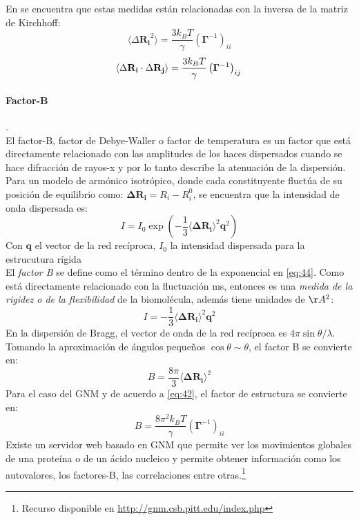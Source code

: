 En \cite{Rader2006} se encuentra que estas medidas est\'{a}n relacionadas con la inversa de la matriz de Kirchhoff:\\
\begin{equation}\label{eq:42}
\langle \Delta \mathbf{R_i}^2 \rangle=\frac{3 k_BT}{\gamma}\left(\mathbf{\Gamma}^{-1}\right)_{ii}
\end{equation}
\begin{equation}\label{eq:43}
\langle \Delta \mathbf{R_i}\cdot\Delta \mathbf{R_j} \rangle=\frac{3 k_BT}{\gamma}\left(\mathbf{\Gamma}^{-1}\right)_{ij}\\
\end{equation}
\paragraph{Factor-B}.\\
El factor-B, factor de Debye-Waller o factor de temperatura es un factor que est\'{a} directamente relacionado con las amplitudes de los haces dispersados cuando se hace difracci\'{o}n de rayos-x y por lo tanto describe la atenuaci\'{o}n de la dispersi\'{o}n.\\

Para un modelo de arm\'{o}nico isotr\'{o}pico, donde cada constituyente fluct\'{u}a de su posici\'{o}n de equilibrio como: $\mathbf{\Delta R_{i}}=R_i-R_i^0$, se encuentra que la intensidad de onda dispersada es:
\begin{equation}\label{eq:44}
I=I_0\exp\left(-\frac{1}{3}\langle\mathbf{\Delta R_{i}}\rangle^2 \mathbf{q}^2\right)
\end{equation}
Con $\mathbf{q}$ el vector de la red rec\'{i}proca, $I_0$ la intensidad dispersada para la estrucutura r\'{i}gida\\

El \textit{factor B} se define como el t\'{e}rmino dentro de la exponencial en \eqref{eq:44}. Como est\'{a} directamente relacionado con la fluctuaci\'{o}n ms, entonces es una \textit{medida de la rigidez o de la flexibilidad} de la biomol\'{e}cula, adem\'{a}s tiene unidades de $\AA^2$:
\begin{equation}\label{eq:45}
I=-\frac{1}{3}\langle\mathbf{\Delta R_{i}}\rangle^2 \mathbf{q}^2
\end{equation}
En la dispersi\'{o}n de Bragg, el vector de onda de la red rec\'{i}proca es $4\pi\sin\theta/\lambda$. Tomando la aproximaci\'{o}n de \'{a}ngulos peque\~{n}os $\cos \theta\sim \theta$, el factor B se convierte en:
\begin{equation}\label{eq:46}
B=\frac{8\pi}{3}\langle\mathbf{\Delta R_{i}}\rangle^2
\end{equation}
Para el caso del GNM y de acuerdo a \eqref{eq:42}, el factor de estructura se convierte en:
\begin{equation}\label{eq:47}
B=\frac{8\pi^2 k_BT}{\gamma}\left(\mathbf{\Gamma}^{-1}\right)_{ii}
\end{equation}
Existe un servidor web basado en GNM que permite ver los movimientos globales de una prote\'{i}na o de un \'{a}cido nucleico y permite obtener informaci\'{o}n como los autovalores, los factores-B, las correlaciones entre otras.\footnote{ Recurso disponible en \url{http://gnm.csb.pitt.edu/index.php}}

